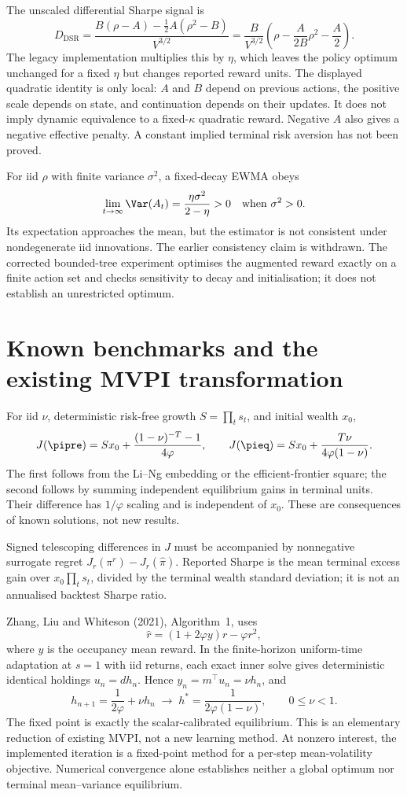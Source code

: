 The unscaled differential Sharpe signal is
\[
 D_{\mathrm{DSR}}
 =\frac{B(\rho-A)-\tfrac12 A(\rho^2-B)}{V^{3/2}}
 =\frac{B}{V^{3/2}}\left(\rho-\frac{A}{2B}\rho^2-\frac A2\right).
\]
The legacy implementation multiplies this by $\eta$, which leaves the policy
optimum unchanged for a fixed $\eta$ but changes reported reward units.
The displayed quadratic identity is only local: $A$ and $B$ depend on previous
actions, the positive scale depends on state, and continuation depends on their
updates. It does not imply dynamic equivalence to a fixed-$\kappa$ quadratic
reward. Negative $A$ also gives a negative effective penalty. A constant implied
terminal risk aversion has not been proved.

For iid $\rho$ with finite variance $\sigma^2$, a fixed-decay EWMA obeys
\[
 \lim_{t\to\infty}\Var(A_t)=\frac{\eta\sigma^2}{2-\eta}>0
 \quad\text{when }\sigma^2>0.
\]
Its expectation approaches the mean, but the estimator is not consistent under
nondegenerate iid innovations. The earlier consistency claim is withdrawn.
The corrected bounded-tree experiment optimises the augmented reward exactly
on a finite action set and checks sensitivity to decay and initialisation;
it does not establish an unrestricted optimum.

\ifdim\dimexpr\pagegoal-\pagetotal\relax<120pt\newpage\fi
\section{Known benchmarks and the existing MVPI transformation}
\label{app:mvpi}
For iid $\nu$, deterministic risk-free growth $S=\prod_ts_t$, and initial
wealth $x_0$,
\begin{equation}
 J(\pipre)=Sx_0+\frac{(1-\nu)^{-T}-1}{4\varphi},\qquad
 J(\pieq)=Sx_0+\frac{T\nu}{4\varphi(1-\nu)}.
\end{equation}
The first follows from the Li--Ng embedding or the efficient-frontier square;
the second follows by summing independent equilibrium gains in terminal units.
Their difference has $1/\varphi$ scaling and is independent of $x_0$. These are
consequences of known solutions, not new results.

Signed telescoping differences in $J$ must be accompanied by nonnegative
surrogate regret $J_r(\pi^r)-J_r(\widehat\pi)$. Reported Sharpe is the mean
terminal excess gain over $x_0\prod_ts_t$, divided by the terminal wealth
standard deviation; it is not an annualised backtest Sharpe ratio.

Zhang, Liu and Whiteson (2021), Algorithm~1, uses
\[
 \widehat r=(1+2\varphi y)r-\varphi r^2,
\]
where $y$ is the occupancy mean reward. In the finite-horizon uniform-time
adaptation at $s=1$ with iid returns, each exact inner solve gives deterministic
identical holdings $u_n=dh_n$. Hence $y_n=m^{\top}u_n=\nu h_n$, and
\[
 h_{n+1}=\frac{1}{2\varphi}+\nu h_n
 \;\longrightarrow\;
 h^*=\frac{1}{2\varphi(1-\nu)},\qquad 0\le\nu<1.
\]
The fixed point is exactly the scalar-calibrated equilibrium. This is an
elementary reduction of existing MVPI, not a new learning method. At nonzero
interest, the implemented iteration is a fixed-point method for a per-step
mean-volatility objective. Numerical convergence alone establishes neither
a global optimum nor terminal mean--variance equilibrium.
